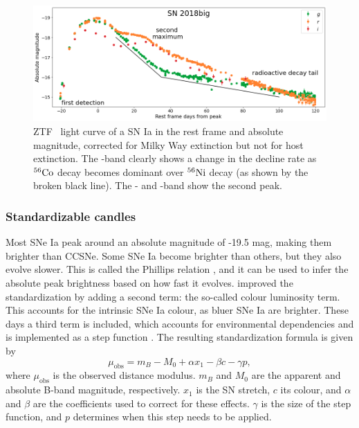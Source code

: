 \documentclass[a4paper,oneside,12pt, class=Latex/Classes/PhDthesisPSnPDF, crop=false]{standalone}
\begin{document}
\begin{figure}
    \centering
    \includegraphics[width=\textwidth]{../Images/chapter_1/Ia-norm_example.png}
    \caption{ZTF \ztfg\ztfr\ztfi\ light curve of a SN Ia in the rest frame and absolute magnitude, corrected for Milky Way extinction but not for host extinction. The \ztfg-band clearly shows a change in the decline rate as $^{56}\text{Co}$ decay becomes dominant over $^{56}\text{Ni}$ decay (as shown by the broken black line). The \ztfr- and \ztfi-band show the second peak.}
    \label{Ia-norm_example}
\end{figure}

\subsubsection{Standardizable candles}
\label{Standard_candle}
Most SNe Ia peak around an absolute magnitude of -19.5 mag, making them brighter than CCSNe. Some SNe Ia become brighter than others, but they also evolve slower. This is called the Phillips relation \citep{phillips_rel}, and it can be used to infer the absolute peak brightness based on how fast it evolves. \citet{Tripp_colour_rel} improved the standardization by adding a second term: the so-called colour luminosity term. This accounts for the intrinsic SNe Ia colour, as bluer SNe Ia are brighter. These days a third term is included, which accounts for environmental dependencies and is implemented as a step function \citep{Kelly_mass_step, Sullivan_mass_step}. The resulting standardization formula is given by
\begin{equation}
    \mu_\text{obs} = m_B - M_0 + \alpha x_1 - \beta c - \gamma p,
\end{equation}
where $\mu_\text{obs}$ is the observed distance modulus. $m_B$ and $M_0$ are the apparent and absolute B-band magnitude, respectively. $x_1$ is the SN stretch, $c$ its colour, and $\alpha$ and $\beta$ are the coefficients used to correct for these effects. $\gamma$ is the size of the step function, and $p$ determines when this step needs to be applied.
\end{document}
